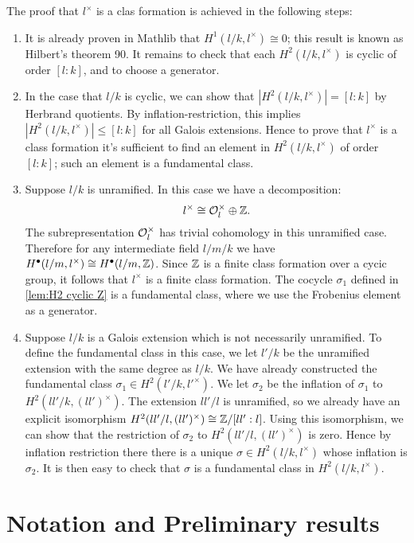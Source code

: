 The proof that $l^\times$ is a clas formation is achieved in the following steps:
\begin{enumerate}
	\item
	It is already proven in Mathlib that $H^1(l/k,l^\times) \cong 0$;
	this result is known as Hilbert's theorem 90.
	It remains to check that each $H^2(l/k,l^\times)$ is cyclic of order $[l:k]$, and to
	choose a generator.
	\item
	In the case that $l/k$ is cyclic, we can show that $|H^2(l/k,l^\times)| = [l:k]$ by
	Herbrand quotients. By inflation-restriction, this implies $|H^2(l/k,l^\times)| \le [l:k]$
	for all Galois extensions. Hence to prove that $l^\times$ is a class formation it's sufficient to
	find an element in $H^2(l/k,l^\times)$ of order $[l:k]$; such an element is a fundamental class.
	\item
	Suppose $l/k$ is unramified. In this case we have a decomposition:
	\[
		l ^\times \cong {\mathcal O}_l^\times \oplus {\mathbb Z}.
	\]
	The subrepresentation ${\mathcal O}_l^\times$ has trivial cohomology in this unramified case.
	Therefore for any intermediate field $l/m/k$ we have
	$H^\bullet(l/m,l^\times) \cong H^\bullet(l/m,{\mathbb Z})$.
	Since ${\mathbb Z}$ is a finite class formation over a cycic group, it follows that $l^\times$ is a
	finite class formation.
	The cocycle $\sigma_1$ defined in \ref{lem:H2 cyclic Z} is a fundamental class,
	where we use the Frobenius element as a generator.
	\item
	Suppose $l/k$ is a Galois extension which is not necessarily unramified. To define the
	fundamental class in this case, we let $l'/k$ be the unramified extension with the same degree as
	$l/k$. We have already constructed the fundamental class $\sigma_1 \in H^2(l'/k, l'^\times)$.
	We let $\sigma_2$ be the inflation of $\sigma_1$ to $H^2(ll'/k, (ll')^\times)$.
	The extension $ll' / l$ is unramified, so we already have an explicit isomorphism
	$H^2(ll'/l, (ll')^\times) \cong {\mathbb Z} / [ll':l]$.
	Using this isomorphism, we can show that the restriction of $\sigma_2$
	to $H^2(ll'/l, (ll')^\times)$ is zero.
	Hence by inflation restriction there there is a unique $\sigma \in H^2(l/k, l^\times)$ whose
	inflation is $\sigma_2$.
	It is then easy to check that $\sigma$ is a fundamental class in $H^2(l/k,l^\times)$.
\end{enumerate}



\section{Notation and Preliminary results}

